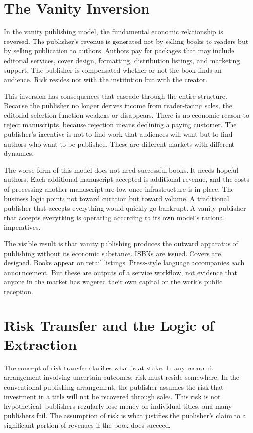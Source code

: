 \documentclass[12pt, a4paper]{article}
\begin{document}
\section{The Vanity Inversion}

In the vanity publishing model, the fundamental economic relationship is reversed. The publisher's revenue is generated not by selling books to readers but by selling publication to authors. Authors pay for packages that may include editorial services, cover design, formatting, distribution listings, and marketing support. The publisher is compensated whether or not the book finds an audience. Risk resides not with the institution but with the creator.

This inversion has consequences that cascade through the entire structure. Because the publisher no longer derives income from reader-facing sales, the editorial selection function weakens or disappears. There is no economic reason to reject manuscripts, because rejection means declining a paying customer. The publisher's incentive is not to find work that audiences will want but to find authors who want to be published. These are different markets with different dynamics.

The worse form of this model does not need successful books. It needs hopeful authors. Each additional manuscript accepted is additional revenue, and the costs of processing another manuscript are low once infrastructure is in place. The business logic points not toward curation but toward volume. A traditional publisher that accepts everything would quickly go bankrupt. A vanity publisher that accepts everything is operating according to its own model's rational imperatives.

The visible result is that vanity publishing produces the outward apparatus of publishing without its economic substance. ISBNs are issued. Covers are designed. Books appear on retail listings. Press-style language accompanies each announcement. But these are outputs of a service workflow, not evidence that anyone in the market has wagered their own capital on the work's public reception.

\section{Risk Transfer and the Logic of Extraction}

The concept of risk transfer clarifies what is at stake. In any economic arrangement involving uncertain outcomes, risk must reside somewhere. In the conventional publishing arrangement, the publisher assumes the risk that investment in a title will not be recovered through sales. This risk is not hypothetical; publishers regularly lose money on individual titles, and many publishers fail. The assumption of risk is what justifies the publisher's claim to a significant portion of revenues if the book does succeed.
\end{document}
